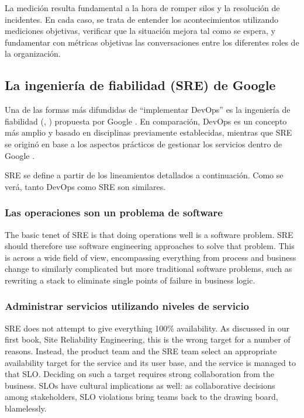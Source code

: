 La medición resulta fundamental a la hora de romper silos y la
resolución de incidentes. En cada caso, se trata de entender los
acontecimientos utilizando mediciones objetivas, verificar que la
situación mejora tal como se espera, y fundamentar con métricas
objetivas las conversaciones entre los diferentes roles de la
organización.

\subsection{La ingeniería de fiabilidad (SRE) de Google}

Una de las formas más difundidas de ``implementar DevOps'' es la
ingeniería de fiabilidad (,
) propuesta por Google
\cite{sre}. En
comparación, DevOps es un concepto más amplio y basado en disciplinas
previamente establecidas, mientras que SRE se originó en base a los
aspectos prácticos de gestionar los servicios dentro de Google
\cite{workbook}.

SRE se define a partir de los lineamientos detallados a
continuación. Como se verá, tanto DevOps como SRE son similares.

\subsubsection{Las operaciones son un problema de software}

The basic tenet of SRE is that doing operations well is a software
problem. SRE should therefore use software engineering approaches to
solve that problem. This is across a wide field of view, encompassing
everything from process and business change to similarly complicated
but more traditional software problems, such as rewriting a stack to
eliminate single points of failure in business logic.

\subsubsection{Administrar servicios utilizando niveles de servicio}

SRE does not attempt to give everything 100\% availability. As
discussed in our first book, Site Reliability Engineering, this is the
wrong target for a number of reasons. Instead, the product team and
the SRE team select an appropriate availability target for the service
and its user base, and the service is managed to that SLO. Deciding on
such a target requires strong collaboration from the business. SLOs
have cultural implications as well: as collaborative decisions among
stakeholders, SLO violations bring teams back to the drawing board,
blamelessly.

